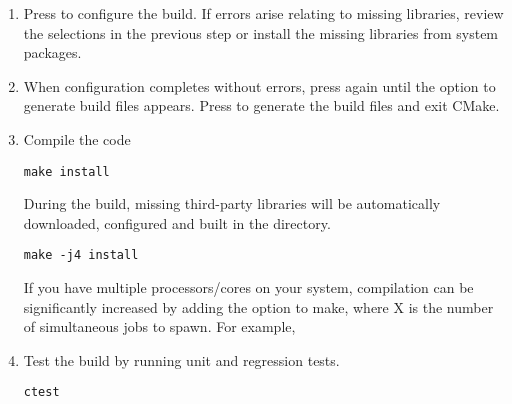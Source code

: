 \begin{enumerate}
    \item Press  to configure the build. If errors arise relating to
    missing libraries, review the  selections in the previous
    step or install the missing libraries from system packages. 
    
    \item When configuration completes without errors, press  again
    until the option  to generate build files appears. Press 
    to generate the build files and exit CMake.
    
    \item Compile the code
    \begin{lstlisting}[style=BashInputStyle]
        make install
    \end{lstlisting}
    During the build, missing third-party libraries will be automatically
    downloaded, configured and built in the \nekpp {} directory.
    
    \newsavebox\installationMacTip
    \begin{lrbox}{\installationMacTip}\begin{minipage}{0.8\linewidth}
    \begin{lstlisting}[style=BashInputStyle]
    make -j4 install
    \end{lstlisting}
    \end{minipage}
    \end{lrbox}
    
    \begin{tipbox}
    If you have multiple processors/cores on your system, compilation can be
    significantly increased by adding the  option to make, where X is
    the number of simultaneous jobs to spawn. For example,
    \noindent\usebox\installationMacTip
    \end{tipbox}
    
    \item Test the build by running unit and regression tests.
    \begin{lstlisting}[style=BashInputStyle]
    ctest
    \end{lstlisting}
\end{enumerate}



